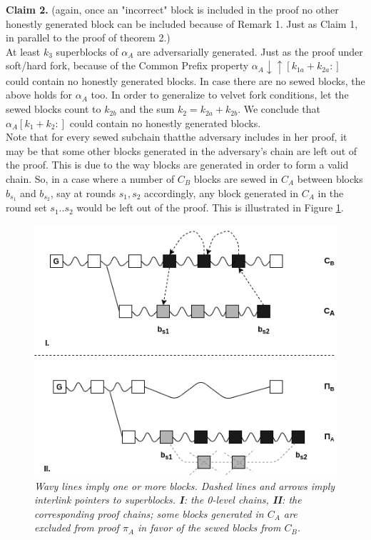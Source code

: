 \documentclass[9pt,a4paper]{article}
\begin{document}
\textbf{Claim 2.} (again, once an "incorrect" block is included in the proof no other honestly generated block can be included because of Remark 1. Just as Claim 1, in parallel to the proof of theorem 2.)\\
At least $k_3$ superblocks of $\alpha_A$ are adversarially generated. Just as the proof under soft/hard fork, because of the Common Prefix property $\alpha_A \downarrow \uparrow [k_{1a}+k_{2a}:]$ could contain no honestly generated blocks. In case there are no sewed blocks, the above holds for $\alpha_A$ too. In order to generalize to velvet fork conditions, let the sewed blocks count to $k_{2b}$ and the sum $k_2 = k_{2a} + k_{2b}$. We conclude that $\alpha_A [k_{1}+k_{2}:]$ could contain no honestly generated blocks. \\ 

Note that for every sewed subchain thatthe adversary includes in her proof, it may be that some other blocks generated in the adversary's chain are left out of the proof. This is due to the way blocks are generated in order to form a valid chain. So, in a case where a number of $C_B$ blocks are sewed in $C_A$ between blocks $b_{s_1}$ and $b_{s_2}$, say at rounds $s_1, s_2$ accordingly, any block generated in $C_A$ in the round set $s_1..s_2$ would be left out of the proof. This is illustrated in Figure \ref{fig:exclude}.\\

\begin{figure}[h!]
	\begin{center}
		\includegraphics[scale=0.5]{figures/exclude.png}
	\end{center}
	\caption{\textit{ Wavy lines imply one or more blocks. Dashed lines and arrows imply interlink pointers to superblocks. \textbf{I}: the 0-level chains, \textbf{II}: the corresponding proof chains; some blocks generated in $C_A$ are excluded from proof $\pi_A$ in favor of the sewed blocks from $C_B$.}}
	\label{fig:exclude}
\end{figure}
\end{document}
